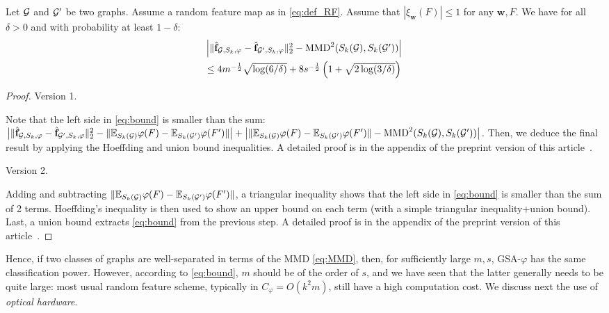 \documentclass{article}
\begin{document}

\begin{theorem}\label{theorem:concentration}
Let $\mathcal{G}$ and $\mathcal{G}'$ be two graphs. %
Assume a random feature map as in \eqref{eq:def_RF}. Assume that $|\xi_\mathbf{w}(F)| \leq 1$ for any $\mathbf{w},F$.
We have for all $\delta>0$ and with probability at least $1-\delta$:
\begin{multline}\label{eq:bound}
\mathsmaller{
 \Big|\|\hat{\mathbf{f}}_{\G,S_k,\varphi} - \hat{\mathbf{f}}_{\G',S_k,\varphi} \|_2^2 - \textup{MMD}^2(S_k(\G),S_k(\G')) \Big| } \\
 \mathsmaller{ \leq 4 m^{-\frac12} \sqrt{\log (6/\delta)} + 8s^{-\frac12} \left(1+\sqrt{2\log(3/\delta)}\right)}
\end{multline}
\end{theorem}
\begin{proof}
		Version 1.
	
	Note that the left side in \eqref{eq:bound} is smaller than the sum:
	$ \big|\|\hat{\mathbf{f}}_{\mathcal{G},S_k,\varphi} - \hat{\mathbf{f}}_{\mathcal{G}',S_k,\varphi} \|_2^2 -\| \mathbb{E}_{S_k(\mathcal{G})} \varphi(F) - \mathbb{E}_{S_k(\mathcal{G}')} \varphi(F')\| \big| + \big|\| \mathbb{E}_{S_k(\mathcal{G})} \varphi(F) - \mathbb{E}_{S_k(\mathcal{G}')} \varphi(F')\| - \textup{MMD}^2(S_k(\mathcal{G}),S_k(\mathcal{G}')) \big|$. Then, we deduce the final result by applying the Hoeffding and  union bound inequalities.  A detailed proof is in the appendix of the preprint version of this article~\cite{ghanem2020fast}.
	
	Version 2.
	
	Adding and subtracting $\| \mathbb{E}_{S_k(\mathcal{G})} \varphi(F) - \mathbb{E}_{S_k(\mathcal{G}')} \varphi(F')\|$, a triangular inequality shows that the left side in \eqref{eq:bound} is smaller than the sum of 2 terms. Hoeffding's inequality is then used to show an upper bound on each term (with a simple triangular inequality+union bound). Last, a union bound extracts \eqref{eq:bound} from the previous step. A detailed proof is in the appendix of the preprint version of this article~\cite{ghanem2020fast}.
\end{proof}
Hence, if two classes of graphs are well-separated in terms of the MMD \eqref{eq:MMD}, then, for sufficiently large $m,s$, GSA-$\varphi$ has the same classification power. However, according to \eqref{eq:bound}, $m$ should be of the order of $s$, and we have seen that the latter generally needs to be quite large:  most usual random feature scheme, typically in $C_\varphi =O(k^2 m)$, still have a high computation cost. We discuss next the use of \emph{optical hardware}.
\end{document}
